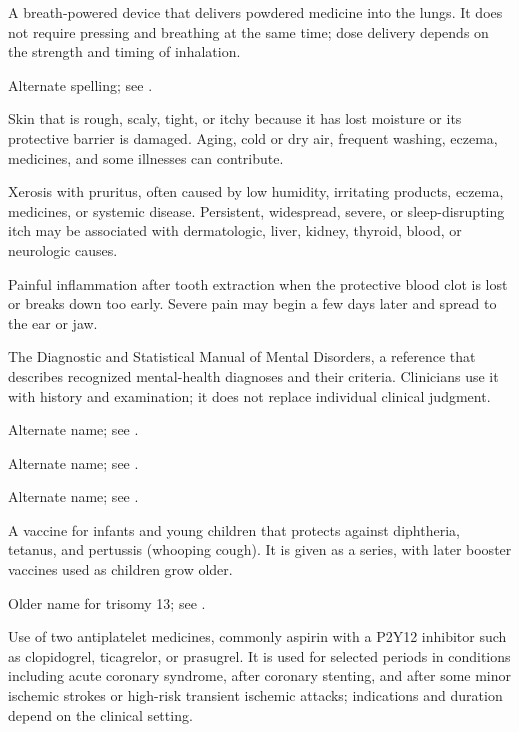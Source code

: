  A breath-powered device that delivers powdered medicine into the lungs. It does not require pressing and breathing at the same time; dose delivery depends on the strength and timing of inhalation.

 Alternate spelling; see .

 Skin that is rough, scaly, tight, or itchy because it has lost moisture or its protective barrier is damaged. Aging, cold or dry air, frequent washing, eczema, medicines, and some illnesses can contribute.

 Xerosis with pruritus, often caused by low humidity, irritating products, eczema, medicines, or systemic disease. Persistent, widespread, severe, or sleep-disrupting itch may be associated with dermatologic, liver, kidney, thyroid, blood, or neurologic causes.

 Painful inflammation after tooth extraction when the protective blood clot is lost or breaks down too early. Severe pain may begin a few days later and spread to the ear or jaw.

 The Diagnostic and Statistical Manual of Mental Disorders, a reference that describes recognized mental-health diagnoses and their criteria. Clinicians use it with history and examination; it does not replace individual clinical judgment.

 Alternate name; see .

 Alternate name; see .

 Alternate name; see .

 A vaccine for infants and young children that protects against diphtheria, tetanus, and pertussis (whooping cough). It is given as a series, with later booster vaccines used as children grow older.

 Older name for trisomy 13; see .

 Use of two antiplatelet medicines, commonly aspirin with a P2Y12 inhibitor
such as clopidogrel, ticagrelor, or prasugrel. It is used for selected periods in conditions including
acute coronary syndrome, after coronary stenting, and after some minor ischemic strokes or high-risk
transient ischemic attacks; indications and duration depend on the clinical setting.

